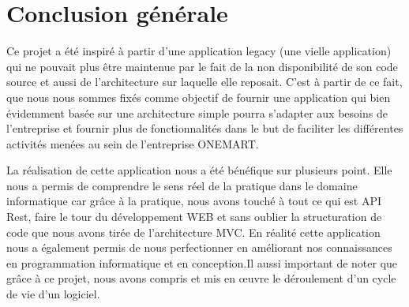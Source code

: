 \chapter*{Conclusion générale}
	
	
	Ce projet a été inspiré à partir d'une application legacy (une vielle application) qui ne pouvait plus être maintenue par le fait de la non disponibilité de son code source et aussi de l'architecture sur laquelle elle reposait. C'est à partir de ce fait, que nous nous sommes fixés comme objectif de fournir une application qui bien évidemment basée sur une architecture simple pourra s'adapter aux besoins de l'entreprise et fournir plus de fonctionnalités dans le but de faciliter les différentes activités menées au sein de l'entreprise ONEMART.
	
	La réalisation de cette application nous a été bénéfique sur plusieurs point. Elle nous a permis de comprendre le sens réel de la pratique dans le domaine informatique car grâce à la pratique, nous avons touché à tout ce qui est API Rest, faire le tour du développement WEB et sans oublier la structuration de code que nous avons tirée de l'architecture MVC.
	En réalité cette application nous a également permis de nous perfectionner en améliorant nos connaissances en programmation informatique et en conception.Il aussi important de noter que grâce à ce projet, nous avons compris et mis en œuvre le déroulement d'un cycle de vie d'un logiciel.
	